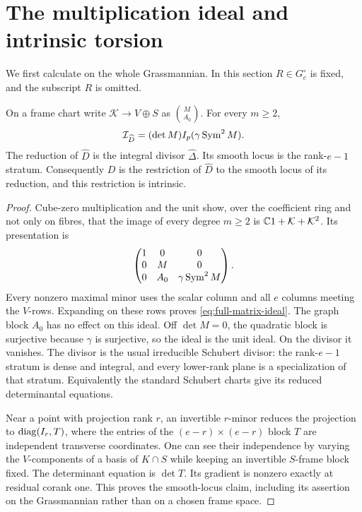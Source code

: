 \section{The multiplication ideal and intrinsic torsion}
\label{sec:fitting}
We first calculate on the whole Grassmannian. In this section
$R\in G_e^\circ$ is fixed, and the subscript $R$ is omitted.

\begin{proposition}\label{prop:full-fitting}
On a frame chart write $\mathcal K\to V\oplus S$ as
$\binom{M}{A_0}$. For every $m\ge2$,
\begin{equation}\label{eq:full-matrix-ideal}
 \mathcal I_{\widehat D}=(\det M)I_p(\gamma\operatorname{Sym}^2M).
\end{equation}
The reduction of $\widehat D$ is the integral divisor
$\widehat\Delta$. Its smooth locus is the rank-$e-1$ stratum.
Consequently $D$ is the restriction of $\widehat D$ to the smooth
locus of its reduction, and this restriction is intrinsic.
\end{proposition}
\begin{proof}
Cube-zero multiplication and the unit show, over the coefficient ring
and not only on fibres, that the image of every degree $m\ge2$ is
$\mathbb C1+\mathcal K+\mathcal K^2$. Its presentation is
\[
 \begin{pmatrix}
  1&0&0\\0&M&0\\0&A_0&\gamma\operatorname{Sym}^2M
 \end{pmatrix}.
\]
Every nonzero maximal minor uses the scalar column and all $e$
columns meeting the $V$-rows. Expanding on these rows proves
\eqref{eq:full-matrix-ideal}. The graph block $A_0$ has no effect on
this ideal. Off $\det M=0$, the quadratic block is surjective because
$\gamma$ is surjective, so the ideal is the unit ideal. On the divisor
it vanishes. The divisor is the usual irreducible Schubert divisor:
the rank-$e-1$ stratum is dense and integral, and every lower-rank
plane is a specialization of that stratum. Equivalently the standard
Schubert charts give its reduced determinantal equations.

Near a point with projection rank $r$, an invertible $r$-minor
reduces the projection to $\operatorname{diag}(I_r,T)$, where the entries of the
$(e-r)\times(e-r)$ block $T$ are independent transverse coordinates.
One can see their independence by varying the $V$-components of a
basis of $K\cap S$ while keeping an invertible $S$-frame block fixed.
The determinant equation is $\det T$. Its gradient is nonzero
exactly at residual corank one. This proves the smooth-locus claim,
including its assertion on the Grassmannian rather than on a chosen
frame space.
\end{proof}

